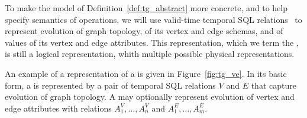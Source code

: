 To make the model of Definition~\ref{def:tg_abstract} more concrete,
and to help specify semantics of \tg operations, we will use
valid-time temporal SQL relations~\cite{DBLP:conf/vldb/BohlenSS96} to
represent evolution of graph topology, of its vertex and edge schemas,
and of values of its vertex and edge attributes.  This representation,
which we term the {\em \ve \tg}, is still a logical representation,
whith multiple possible physical representations.

An example of a \ve representation of a \tg is given in
Figure~\ref{fig:tg_ve}.  In its basic form, a \tg is represented by a
pair of temporal SQL relations $V$ and $E$ that capture evolution of
graph topology.  A \tg may optionally represent evolution of vertex
and edge attributes with relations $A^{V}_1, \ldots, A^{V}_n$ and
$A^{E}_1, \ldots, A^{E}_m$.



